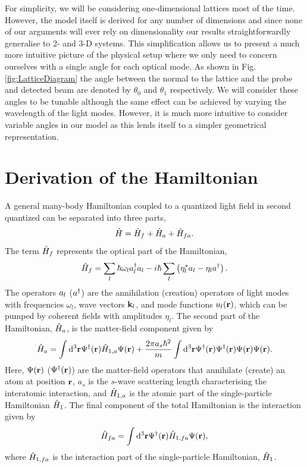 For simplicity, we will be considering one-dimensional lattices most
of the time. However, the model itself is derived for any number of
dimensions and since none of our arguments will ever rely on
dimensionality our results straightforwardly generalise to 2- and 3-D
systems. This simplification allows us to present a much more
intuitive picture of the physical setup where we only need to concern
ourselves with a single angle for each optical mode. As shown in
Fig. \ref{fig:LatticeDiagram} the angle between the normal to the
lattice and the probe and detected beam are denoted by $\theta_0$ and
$\theta_1$ respectively. We will consider these angles to be tunable
although the same effect can be achieved by varying the wavelength of
the light modes. However, it is much more intuitive to consider
variable angles in our model as this lends itself to a simpler
geometrical representation.

\section{Derivation of the Hamiltonian}
\label{sec:derivation}

A general many-body Hamiltonian coupled to a quantized light field in
second quantized can be separated into three parts,
\begin{equation}
\label{eq:FullH}
  \hat{H} = \hat{H}_f + \hat{H}_a + \hat{H}_{fa}.
\end{equation}
The term $\hat{H}_f$ represents the optical part of the Hamiltonian,
\begin{equation}
\label{eq:Hf}
  \hat{H}_f = \sum_l \hbar \omega_l a^\dagger_l a_l -
  i \hbar \sum_l \left( \eta_l^* a_l - \eta_l a^\dagger \right).
\end{equation}
The operators $a_l$ ($a^\dagger$) are the annihilation (creation) operators
of light modes with frequencies $\omega_l$, wave vectors $\mathbf{k}_l$,
and mode functions $u_l(\mathbf{r})$, which can be pumped by coherent
fields with amplitudes $\eta_l$. The second part of the Hamiltonian,
$\hat{H}_a$, is the matter-field component given by
\begin{equation}
\label{eq:Ha}
  \hat{H}_a = \int \mathrm{d}^3 \mathbf{r} \Psi^\dagger(\mathbf{r}) \hat{H}_{1,a}
  \Psi(\mathbf{r}) + \frac{2 \pi a_s \hbar^2}{m} \int \mathrm{d}^3 \mathbf{r}
  \Psi^\dagger(\mathbf{r}) \Psi^\dagger(\mathbf{r}) \Psi(\mathbf{r}) \Psi(\mathbf{r}).
\end{equation}
Here, $\Psi(\mathbf{r})$ ($\Psi^\dagger(\mathbf{r})$) are the matter-field
operators that annihilate (create) an atom at position $\mathbf{r}$, $a_s$
is the $s$-wave scattering length characterising the interatomic
interaction, and $\hat{H}_{1,a}$ is the atomic part of the single-particle
Hamiltonian $\hat{H}_1$. The final component of the total Hamiltonian is
the interaction given by 
\begin{equation}
  \label{eq:Hfa}
  \hat{H}_{fa} = \int \mathrm{d}^3 \mathbf{r} \Psi^\dagger(\mathbf{r}) \hat{H}_{1,fa}
  \Psi(\mathbf{r}),
\end{equation}
where $\hat{H}_{1,fa}$ is the interaction part of the single-particle
Hamiltonian, $\hat{H}_1$.

